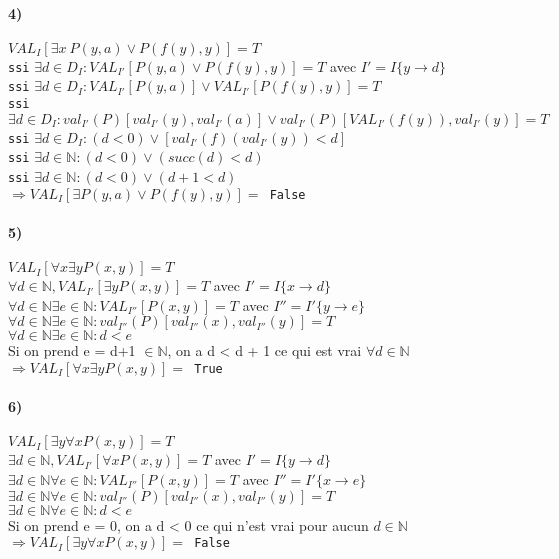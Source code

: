 {    \paragraph{4)}
    $VAL_I[\exists x \ P(y,a)\lor P(f(y), y)] = T$ 
    \\
    \texttt{ssi} $\exists d\in D_{I}:VAL_{I'}[P(y,a)\lor P(f(y),y)] = T$ avec $I' = I \{y \rightarrow d\}$
    \\
    \texttt{ssi} $\exists d\in D_{I}:VAL_{I'}[P(y,a)]\lor VAL_{I'}[P(f(y),y)] = T$
    \\
    \texttt{ssi} $\exists d\in D_{I}:val_{I'}(P)[val_{I'}(y), val_{I'}(a)]\lor val_{I'}(P)[VAL_{I'}(f(y)), val_{I'}(y)] = T$
    \\
    \texttt{ssi} $\exists d\in D_{I}:(d<0)\lor [val_{I'}(f)(val_{I'}(y)) < d]$
    \\%
    \texttt{ssi} $\exists d\in \mathbb{N}:(d<0)\lor (succ(d) < d)$
    \\
    \texttt{ssi} $\exists d\in \mathbb{N}: (d<0)\lor (d+1 < d)$
    \\
    $\Rightarrow  VAL_I[\exists P(y,a)\lor P(f(y), y)] = $\texttt{ False} 

    \paragraph{5)}
    $VAL_I[\forall x \exists y P(x,y)] = T$
    \\
	$\forall d\in \mathbb{N}, VAL_{I'}[\exists yP(x,y)] = T$ avec $I' = I\{x \rightarrow d\}$
	\\
	$\forall d\in \mathbb{N} \exists e \in \mathbb{N} : VAL_{I''}[P(x,y)] = T$ avec $I'' = I'\{y \rightarrow e\}$
	\\
	$\forall d\in \mathbb{N} \exists e \in \mathbb{N} : val_{I''}(P)[val_{I''}(x), val_{I''}(y)] = T$
	\\
	$\forall d\in \mathbb{N} \exists e \in \mathbb{N} : d<e$ 
	\\
	Si on prend e = d+1 $\in \mathbb{N}$, on a d < d + 1 ce qui est vrai $\forall d \in \mathbb{N}$
	\\
	$\Rightarrow  VAL_I[\forall x \exists y P(x,y)] = $\texttt{ True}
	
    \paragraph{6)}
    $VAL_I[\exists y \forall x P(x,y)] = T$
    \\
	$\exists d\in \mathbb{N}, VAL_{I'}[\forall xP(x,y)] = T$ avec $I' = I\{y \rightarrow d\}$
	\\
	$\exists d\in \mathbb{N} \forall e \in \mathbb{N} : VAL_{I''}[P(x,y)] = T$ avec $I'' = I'\{x \rightarrow e\}$
	\\
	$\exists d\in \mathbb{N} \forall e \in \mathbb{N} : val_{I''}(P)[val_{I''}(x), val_{I''}(y)] = T$
	\\
	$\exists d\in \mathbb{N} \forall e \in \mathbb{N} : d<e$ 
	\\
	Si on prend e = 0, on a d < 0 ce qui n'est vrai pour aucun $d \in \mathbb{N}$
	\\
	$\Rightarrow  VAL_I[\exists y \forall x P(x,y)] = $\texttt{ False}

    \par} %
